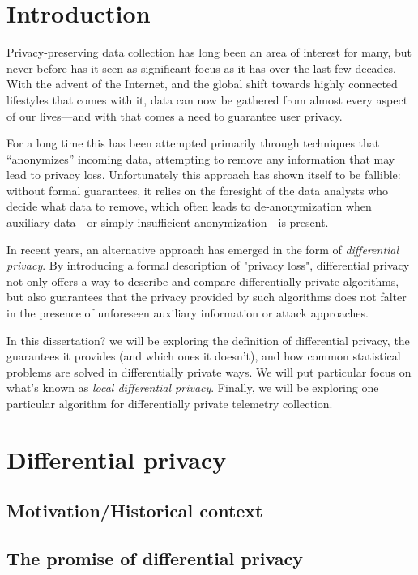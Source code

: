 \documentclass[12pt]{article}
\newcommand{\todo}[1]{{\color{red}#1}}
\begin{document}
\section{Introduction}

Privacy-preserving data collection has long been an area of interest for many, but never before has it seen as significant focus as it has over the last few decades. With the advent of the Internet, and the global shift towards highly connected lifestyles that comes with it, data can now be gathered from almost every aspect of our lives---and with that comes a need to guarantee user privacy.

For a long time this has been attempted primarily through techniques that ``anonymizes'' incoming data, attempting to remove any information that may lead to privacy loss. Unfortunately this approach has shown itself to be fallible: without formal guarantees, it relies on the foresight of the data analysts who decide what data to remove, which often leads to de-anonymization when auxiliary data---or simply insufficient anonymization---is present.

\bigskip

In recent years, an alternative approach has emerged in the form of \emph{differential privacy}. By introducing a formal description of "privacy loss", differential privacy not only offers a way to describe and compare differentially private algorithms, but also guarantees that the privacy provided by such algorithms does not falter in the presence of unforeseen auxiliary information or attack approaches.

In this \todo{dissertation?} we will be exploring the definition of differential privacy, the guarantees it provides (and which ones it doesn't), and how common statistical problems are solved in differentially private ways. We will put particular focus on what's known as \emph{local differential privacy}. Finally, we will be exploring one particular algorithm for differentially private telemetry collection.

\section{Differential privacy}

\subsection{Motivation/Historical context}

\subsection{The promise of differential privacy}
\end{document}
